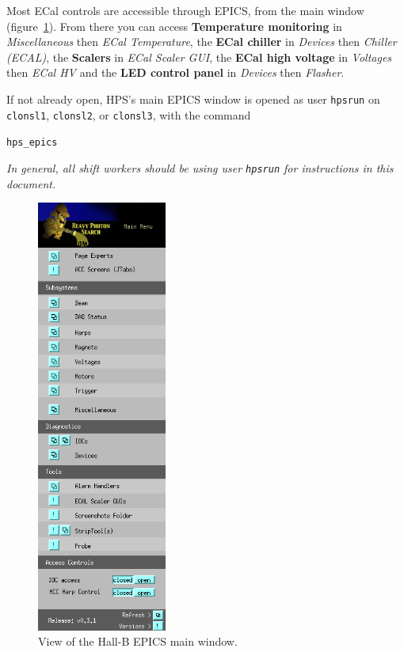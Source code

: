 \documentclass[12pt]{article}
\begin{document}
Most ECal controls are accessible through EPICS, from the main window (figure~\ref{EPICSmain}). From there you can access {\bf Temperature monitoring} in {\it Miscellaneous} then {\it ECal Temperature}, the {\bf ECal chiller} in {\it Devices} then {\it Chiller (ECAL)}, the {\bf Scalers} in {\it ECal Scaler GUI}, the {\bf ECal high voltage} in {\it Voltages} then {\it ECal HV} and the {\bf LED control panel} in {\it Devices} then {\it Flasher}.  

If not already open, HPS's main EPICS window is opened as user \texttt{hpsrun} on \texttt{clonsl1}, \texttt{clonsl2}, or \texttt{clonsl3}, with the command \begin{center}\texttt{hps\_epics}\end{center}

    {\em   In general, all shift workers should be using user \texttt{hpsrun} for instructions in this document.}

\begin{figure}[h!]
\center
\includegraphics[width=0.38\textwidth]{pics/hps_epics_2014_12_15.png}
\caption{\small \label{EPICSmain} View of the Hall-B EPICS main window.}
\end{figure}
\end{document}
